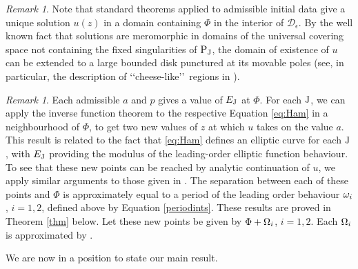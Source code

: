 \documentclass[a4paper,reqno]{amsart}
\theoremstyle{definition}
\theoremstyle{remark}
\newtheorem{rem}[definition]{Remark}
\theoremstyle{theorem}
\numberwithin{equation}{section}
\begin{document}
\begin{rem}
Note that standard theorems applied to admissible initial data give a unique solution $u(z)$ in a domain containing $\Phi$ in the interior of $\mathcal D_\epsilon$. By the well known fact that solutions are meromorphic in domains of the universal covering space not containing the fixed singularities of ${\rm P}_{\rm J}$, the domain of existence of $u$ can be extended to a large bounded disk punctured at its movable poles  (see, in particular, the description of \lq\lq cheese-like\rq\rq\ regions in \cite{JK1994}). 
\end{rem}
\begin{rem}
Each admissible $a$ and $p$ gives a value of $E_{\rm J}$ at $\Phi$. For each $\rm J$, we can apply the inverse function theorem to the respective Equation \eqref{eq:Ham} in a neighbourhood of $\Phi$, to get two new values of $z$ at which $u$ takes on the value $a$. This result is related to the fact that \eqref{eq:Ham} defines an elliptic curve for each $\rm J$, with $E_{\rm J}$ providing the modulus of the leading-order elliptic function behaviour. To see that these new points can be reached by analytic continuation of $u$, we apply similar arguments to those given in \cite{JK1994}. The separation between each of these points and $\Phi$ is approximately equal to a period of the leading order behaviour $\omega_i$, $i=1,2$, defined above by Equation \eqref{periodints}. These results are proved in Theorem \ref{thm} below.  
Let these new points be given by $\Phi+\Omega_i$,  $i=1,2$. Each $\Omega_i$ is approximated by . 
\end{rem}
We are now in a position to state our main result. 
\end{document}
